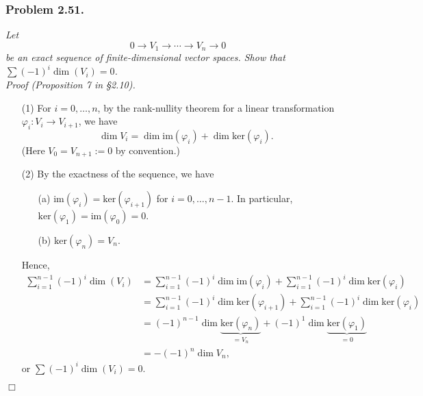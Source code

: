 \documentclass{article}
\begin{document}



\subsubsection*{Problem 2.51.}
\emph{Let
\[
  0 \longrightarrow V_1 \longrightarrow \cdots \longrightarrow V_n \longrightarrow 0
\]
be an exact sequence of finite-dimensional vector spaces.
Show that $\sum (-1)^i \dim(V_i) = 0$.} \\

\emph{Proof (Proposition 7 in \S 2.10).}
\begin{enumerate}
\item[(1)]
  For $i = 0,\ldots,n$,
  by the rank-nullity theorem for a linear transformation
  $\varphi_{i}: V_{i} \to V_{i+1}$, we have
  \[
    \dim V_{i} = \dim \mathrm{im}(\varphi_{i}) + \dim \mathrm{ker}(\varphi_{i}).
  \]
  (Here $V_0 = V_{n+1} := 0$ by convention.)

\item[(2)]
  By the exactness of the sequence, we have
  \begin{enumerate}
  \item[(a)]
    $\mathrm{im}(\varphi_{i}) = \mathrm{ker}(\varphi_{i+1})$ for $i = 0,\ldots, n-1$.
    In particular, $\mathrm{ker}(\varphi_{1}) = \mathrm{im}(\varphi_{0}) = 0$.

  \item[(b)]
    $\mathrm{ker}(\varphi_{n}) = V_n$.
  \end{enumerate}
  Hence,
  \begin{align*}
    \sum_{i=1}^{n-1} (-1)^i \dim(V_i)
    &= \sum_{i=1}^{n-1} (-1)^i \dim \mathrm{im}(\varphi_{i})
      + \sum_{i=1}^{n-1} (-1)^i \dim \mathrm{ker}(\varphi_{i}) \\
    &= \sum_{i=1}^{n-1} (-1)^i \dim \mathrm{ker}(\varphi_{i+1})
      + \sum_{i=1}^{n-1} (-1)^i \dim \mathrm{ker}(\varphi_{i}) \\
    &= (-1)^{n-1} \dim \underbrace{\mathrm{ker}(\varphi_{n})}_{=V_n}
      + (-1)^1 \dim \underbrace{\mathrm{ker}(\varphi_{1})}_{= 0} \\
    &= -(-1)^n \dim V_n,
  \end{align*}
  or $\sum (-1)^i \dim(V_i) = 0$.
\end{enumerate}
$\Box$ \\\\
\end{document}
